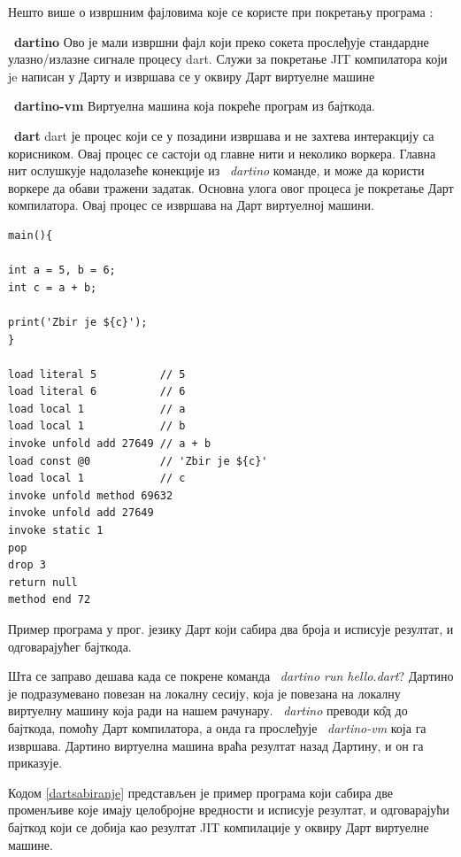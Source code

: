\documentclass[12pt,oneside]{memoir}
\begin{document}
Нешто више о извршним фајловима које се користе при покретању програма \cite{komande}:
\begin{description}
\item ~\textbf{dartino}
Ово је мали извршни фајл који преко сокета прослеђује стандардне улазно/излазне сигнале процесу dart. Служи за покретање JIT компилатора који je написан у Дарту и извршава се у оквиру Дарт виртуелне машине
\item ~\textbf{dartino-vm} 
Виртуелна машина која покреће програм из бајткода.
\item ~\textbf{dart}
dart је процес који се у позадини извршава и не захтева интеракцију са корисником. Овај процес се састоји од главне нити и неколико воркера. Главна нит ослушкује надолазеће конекције из ~\textit{dartino} команде, и може да користи воркере да обави тражени задатак. Основна улога овог процеса је покретање Дарт компилатора. Овај процес се извршава на Дарт виртуелној машини.
\end{description}


\begin{listing}
\begin{verbatim}
main(){

int a = 5, b = 6;
int c = a + b;

print('Zbir je ${c}');
}

load literal 5          // 5
load literal 6          // 6
load local 1            // a
load local 1            // b
invoke unfold add 27649 // a + b
load const @0           // 'Zbir je ${c}'
load local 1            // c
invoke unfold method 69632 
invoke unfold add 27649
invoke static 1
pop
drop 3
return null
method end 72
\end{verbatim}
\caption{Пример програма у прог. језику Дарт који сабира два броја и исписује резултат, и одговарајућег бајткода.}
\label{dartsabiranje}
\end{listing}

Шта се заправо дешава када се покрене команда ~\textit{dartino run hello.dart}? Дартино је подразумевано повезан на локалну сесију, која је повезана на локалну виртуелну машину која ради на нашем рачунару. ~\textit{dartino} преводи к\^{о}д до бајткода, помоћу Дарт компилатора, а онда га прослеђује ~\textit{dartino-vm} која га извршава. Дартино виртуелна машина враћа резултат назад Дартину, и он га приказује.

Кодом \ref{dartsabiranje} представљен је пример програма који сабира две променљиве које имају целобројне вредности и исписује резултат, и одговарајући бајткод који се добија као резултат JIT компилације у оквиру Дарт виртуелне машине.
\end{document}
